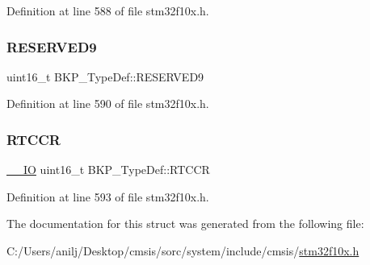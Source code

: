 Definition at line 588 of file stm32f10x.\+h.

\mbox{\label{struct_b_k_p___type_def_a9efc1ff7c68b6adbe832ad858f7ab4f5}} 
\subsubsection{\texorpdfstring{R\+E\+S\+E\+R\+V\+E\+D9}{RESERVED9}}
{\footnotesize\ttfamily uint16\+\_\+t B\+K\+P\+\_\+\+Type\+Def\+::\+R\+E\+S\+E\+R\+V\+E\+D9}



Definition at line 590 of file stm32f10x.\+h.

\mbox{\label{struct_b_k_p___type_def_a4f876006771eb447cb9a8bbb18a7aa10}} 
\subsubsection{\texorpdfstring{R\+T\+C\+CR}{RTCCR}}
{\footnotesize\ttfamily \hyperlink{core__sc300_8h_aec43007d9998a0a0e01faede4133d6be}{\+\_\+\+\_\+\+IO} uint16\+\_\+t B\+K\+P\+\_\+\+Type\+Def\+::\+R\+T\+C\+CR}



Definition at line 593 of file stm32f10x.\+h.



The documentation for this struct was generated from the following file\+:\begin{DoxyCompactItemize}
\item 
C\+:/\+Users/anilj/\+Desktop/cmsis/sorc/system/include/cmsis/\hyperlink{stm32f10x_8h}{stm32f10x.\+h}\end{DoxyCompactItemize}
